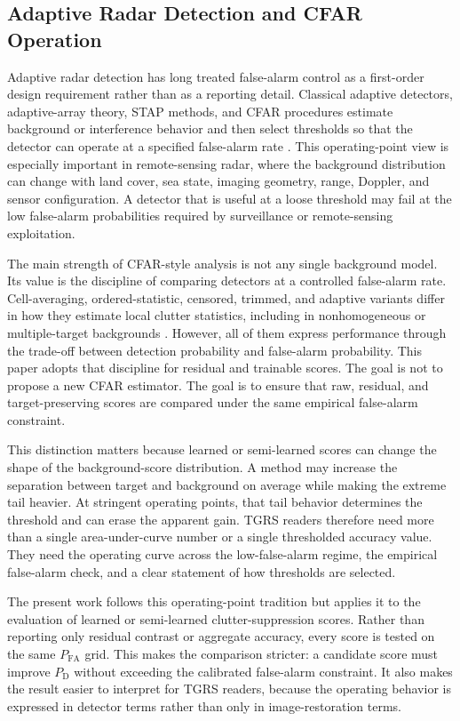 \documentclass[journal]{IEEEtran}
\begin{document}
\subsection{Adaptive Radar Detection and CFAR Operation}

Adaptive radar detection has long treated false-alarm control as a first-order design requirement rather than as a reporting detail. Classical adaptive detectors, adaptive-array theory, STAP methods, and CFAR procedures estimate background or interference behavior and then select thresholds so that the detector can operate at a specified false-alarm rate \cite{reed1974adaptive,melvin2004stap,melvin2014stap,rohling1983cfar,kelly1986adaptive,gandhi1988cfar}. This operating-point view is especially important in remote-sensing radar, where the background distribution can change with land cover, sea state, imaging geometry, range, Doppler, and sensor configuration. A detector that is useful at a loose threshold may fail at the low false-alarm probabilities required by surveillance or remote-sensing exploitation.

The main strength of CFAR-style analysis is not any single background model. Its value is the discipline of comparing detectors at a controlled false-alarm rate. Cell-averaging, ordered-statistic, censored, trimmed, and adaptive variants differ in how they estimate local clutter statistics, including in nonhomogeneous or multiple-target backgrounds \cite{rohling1983cfar,gandhi1988cfar}. However, all of them express performance through the trade-off between detection probability and false-alarm probability. This paper adopts that discipline for residual and trainable scores. The goal is not to propose a new CFAR estimator. The goal is to ensure that raw, residual, and target-preserving scores are compared under the same empirical false-alarm constraint.

This distinction matters because learned or semi-learned scores can change the shape of the background-score distribution. A method may increase the separation between target and background on average while making the extreme tail heavier. At stringent operating points, that tail behavior determines the threshold and can erase the apparent gain. TGRS readers therefore need more than a single area-under-curve number or a single thresholded accuracy value. They need the operating curve across the low-false-alarm regime, the empirical false-alarm check, and a clear statement of how thresholds are selected.

The present work follows this operating-point tradition but applies it to the evaluation of learned or semi-learned clutter-suppression scores. Rather than reporting only residual contrast or aggregate accuracy, every score is tested on the same $P_{\mathrm{FA}}$ grid. This makes the comparison stricter: a candidate score must improve $P_{\mathrm{D}}$ without exceeding the calibrated false-alarm constraint. It also makes the result easier to interpret for TGRS readers, because the operating behavior is expressed in detector terms rather than only in image-restoration terms.
\end{document}
